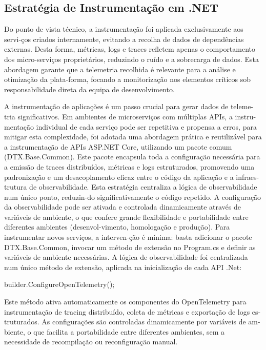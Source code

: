 \subsection{Estratégia de Instrumentação em .NET}

Do ponto de vista técnico, a instrumentação foi aplicada exclusivamente aos servi-ços criados internamente, evitando a recolha de dados de dependências externas. Desta forma, métricas, logs e traces refletem apenas o comportamento dos micro-serviços proprietários, reduzindo o ruído e a sobrecarga de dados. Esta abordagem garante que a telemetria recolhida é relevante para a análise e otimização da plata-forma, focando a monitorização nos elementos críticos sob responsabilidade direta da equipa de desenvolvimento.

A instrumentação de aplicações é um passo crucial para gerar dados de teleme-tria significativos. Em ambientes de microserviços com múltiplas APIs, a instru-mentação individual de cada serviço pode ser repetitiva e propensa a erros, para mitigar esta complexidade, foi adotada uma abordagem prática e reutilizável para a instrumentação de APIs ASP.NET Core, utilizando um pacote comum (DTX.Base.Common). Este pacote encapsula toda a configuração necessária para a emissão de traces distribuídos, métricas e logs estruturados, promovendo uma padronização e um desacoplamento eficaz entre o código da aplicação e a infraes-trutura de observabilidade.
Esta estratégia centraliza a lógica de observabilidade num único ponto, reduzin-do significativamente o código repetido. A configuração da observabilidade pode ser ativada e controlada dinamicamente através de variáveis de ambiente, o que confere grande flexibilidade e portabilidade entre diferentes ambientes (desenvol-vimento, homologação e produção). Para instrumentar novos serviços, a interven-ção é mínima: basta adicionar o pacote DTX.Base.Common, invocar um método de extensão no Program.cs e definir as variáveis de ambiente necessárias.
A lógica de observabilidade foi centralizada num único método de extensão, aplicada na inicialização de cada API .Net:

builder.ConfigureOpenTelemetry();

Este método ativa automaticamente os componentes do OpenTelemetry para instrumentação de tracing distribuído, coleta de métricas e exportação de logs es-truturados. As configurações são controladas dinamicamente por variáveis de am-biente, o que facilita a portabilidade entre diferentes ambientes, sem a necessidade de recompilação ou reconfiguração manual.

